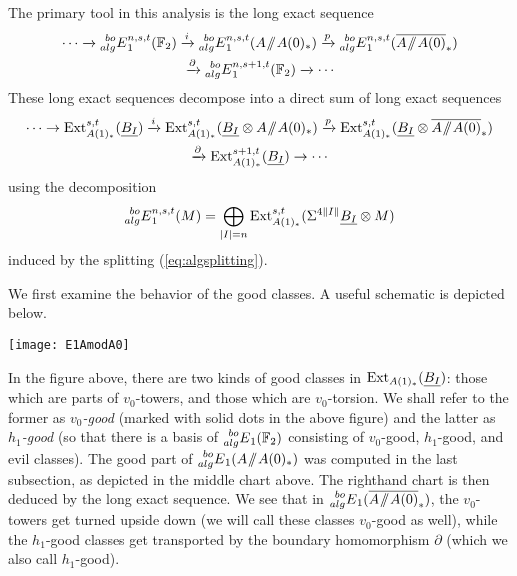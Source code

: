 The primary tool in this analysis is the long exact sequence
\begin{multline}\label{eq:boMSSLESE1}
\cdots \xrightarrow{} \E{bo}{alg}^{n, s, t}_1(\FF_2) 
\xrightarrow{i} \E{bo}{alg}^{n, s, t}_1(A \mmod A(0)_*) \xrightarrow{p}
\E{bo}{alg}^{n, s, t}_1(\AA0) \\
\xrightarrow{\partial} \E{bo}{alg}^{n, s+1, t}_1(\FF_2) \xrightarrow{} \cdots 
\end{multline}
These long exact sequences decompose into a direct sum of long exact sequences
\begin{multline*}
\cdots \rightarrow \Ext^{s,t}_{A(1)_*}(\ull{B_I}) \xrightarrow{i} \Ext^{s,t}_{A(1)_*}(\ull{B_I} \otimes A \mmod A(0)_*) \xrightarrow{p} \Ext^{s,t}_{A(1)_*}(\ull{B_I} \otimes \AA0) \\ \xrightarrow{\partial} \Ext^{s+1, t}_{A(1)_*}(\ull{B_I}) \rightarrow \cdots
\end{multline*}
using the decomposition
\[ \prescript{bo}{alg}{E}^{n, s, t}_1(M) = \bigoplus_{\lvert I \rvert = n}  \operatorname{Ext}^{s, t}_{A(1)_*}(\Sigma^{4\lVert I \rVert} \underline{B_I} \otimes M) \]
induced by the splitting (\ref{eq:algsplitting}).

We first examine the behavior of the good classes.  A useful schematic is depicted below.
\begin{center}
\texttt{[image: E1AmodA0]}
\end{center}
In the figure above, there are two kinds of good classes in $\operatorname{Ext}_{A(1)_*}(\underline{B_I})$: those which are parts of $v_0$-towers, and those which are $v_0$-torsion.  We shall refer to the former as \emph{$v_0$-good} (marked with solid dots in the above figure) and the latter as \emph{$h_1$-good} (so that there is a basis of $\prescript{bo}{alg}{E}_1(\mathbb{F}_2)$ consisting of $v_0$-good, $h_1$-good, and evil classes).  The good part of $\prescript{bo}{alg}{E}_1(A \! \sslash \! A(0)_*)$ was computed in the last subsection, as depicted in the middle chart above.  The righthand chart is then deduced by the long exact sequence.  We see that in $\prescript{bo}{alg}{E}_1(\overline{A\! \sslash \! A(0)}_*)$, the $v_0$-towers get turned upside down (we will call these classes $v_0$-good as well), while the $h_1$-good classes get transported by the boundary homomorphism  $\partial$ (which we also call $h_1$-good).

